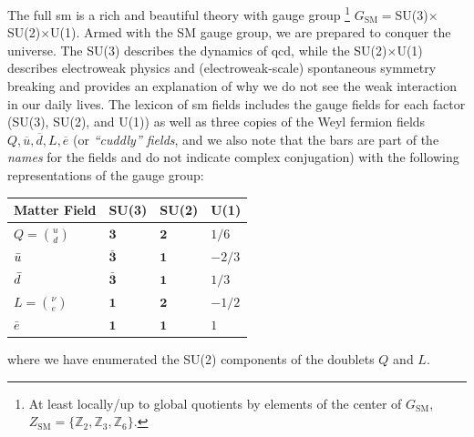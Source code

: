 

The full \gls{sm} is a rich and beautiful theory with gauge group%
\footnote{
    At least locally/up to global quotients by elements of the center of \(G_\text{SM}\), \(Z_\text{SM} = \{\mathbb{Z}_2, \mathbb{Z}_3, \mathbb{Z}_6\}\).
}
%
\(G_\text{SM}=\)SU(3)\(\times\)SU(2)\(\times\)U(1).
%
Armed with the SM gauge group, we are prepared to conquer the universe.
%
The SU(3) describes the dynamics of \gls{qcd}, while the SU(2)\(\times\)U(1) describes electroweak physics and (electroweak-scale) spontaneous symmetry breaking and provides an explanation of why we do not see the weak interaction in our daily lives.
%
The lexicon of \gls{sm} fields includes the gauge fields for each factor (SU(3), SU(2), and U(1)) as well as three copies of the Weyl fermion fields \(Q,\overline{u},\overline{d},L,\overline{e}\) (or \textit{``cuddly'' fields}, and we also note that the bars are part of the \textit{names} for the fields and do not indicate complex conjugation) with the following representations of the gauge group:
\begin{center}
 \begin{tabular}{ |p{3cm}||p{3cm}|p{3cm}|p{3cm}|  }
 \hline
 Matter Field & SU(3) & SU(2) & U(1)\\
 \hline\hline
 \(Q = \binom{u}{d}\) & \(\mathbf{3}\)       & \(\mathbf{2}\) & \(1/6\)  \\
 \(\Bar{u}\)          & \(\bar{\mathbf{3}}\) & \(\mathbf{1}\) & \(-2/3\) \\
 \(\Bar{d}\)          & \(\bar{\mathbf{3}}\) & \(\mathbf{1}\) & \(1/3\)  \\
 \(L = \binom{\nu}{e}\) & \(\mathbf{1}\)       & \(\mathbf{2}\) & \(-1/2\) \\
 \(\bar{e}\) & \(\mathbf{1}\)       & \(\mathbf{1}\) & \(1\)            \\
 \hline
\end{tabular}
\end{center}
where we have enumerated the SU(2) components of the doublets \(Q\) and \(L\).
